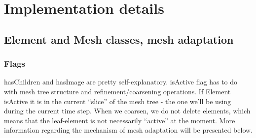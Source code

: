 \section{Implementation details}
\subsection{Element and Mesh classes, mesh adaptation}
\subsubsection{Flags}
hasChildren and hasImage are pretty self-explanatory. isActive flag has to do with mesh tree structure and refinement/coarsening operations.
If Element isActive it is in the current ``slice'' of the mesh tree - the one we'll be using during the current time step. When we coarsen, we do not 
delete elements, which means that the leaf-element is not necessarily ``active'' at the moment. More information regarding the mechanism of mesh adaptation 
will be presented below.
